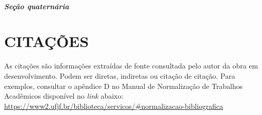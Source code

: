 \documentclass[
  oneside, %
  english,
  brazil
]{abntbibufjf}
\begin{document}








\subsubsection{\textit{Seção quaternária}}







\chapter{CITAÇÕES}

As citações são informações extraídas de fonte consultada pelo autor da obra em desenvolvimento.
Podem ser diretas, indiretas ou citação de citação.
Para exemplos, consultar o apêndice D no Manual de Normalização de Trabalhos Acadêmicos disponível no \textit{link} abaixo:\\
\url{https://www2.ufjf.br/biblioteca/servicos/#normalizacao-bibliografica}
\end{document}
